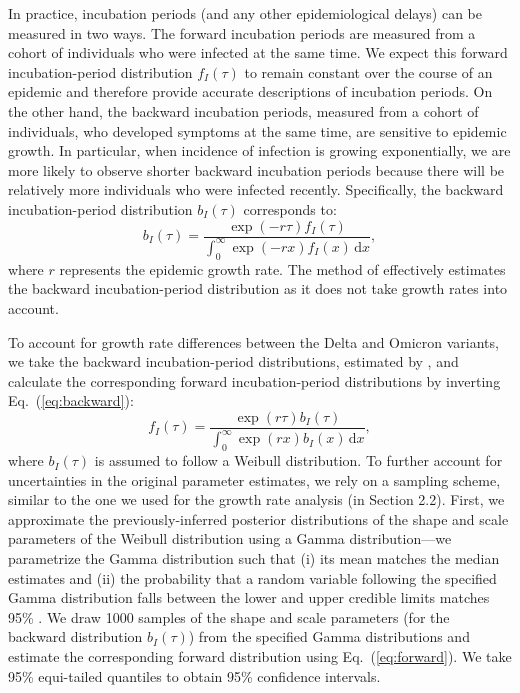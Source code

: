 \documentclass[12pt]{article}
\newcommand{\eref}[1]{Eq.~(\ref{eq:#1})}
\newcommand{\dd}[1]{\ensuremath{\, \mathrm{d}#1}}
\newcommand{\dx}{\dd{x}}
\begin{document}
In practice, incubation periods (and any other epidemiological delays) can be measured in two ways.
The forward incubation periods are measured from a cohort of individuals who were infected at the same time. 
We expect this forward incubation-period distribution $f_I(\tau)$ to remain constant over the course of an epidemic and therefore provide accurate descriptions of incubation periods.
On the other hand, the backward incubation periods, measured from a cohort of individuals, who developed symptoms at the same time, are sensitive to epidemic growth.
In particular, when incidence of infection is growing exponentially, we are more likely to observe shorter backward incubation periods because there will be relatively more individuals who were infected recently.
Specifically, the backward incubation-period distribution $b_I(\tau)$ corresponds to:
\begin{equation}
b_I(\tau) =\frac{ \exp(-r\tau) f_I(\tau)}{\int_0^\infty \exp(-r x) f_I(x)  \dx},
\label{eq:backward}
\end{equation}
where $r$ represents the epidemic growth rate.
The method of \cite{backer2020incubation} effectively estimates the backward incubation-period distribution as it does not take growth rates into account.

To account for growth rate differences between the Delta and Omicron variants, we take the backward incubation-period distributions, estimated by \cite{backer2021omicron}, and calculate the corresponding forward incubation-period distributions by inverting \eref{backward}:
\begin{equation}
f_I(\tau) = \frac{\exp(r\tau) b_I(\tau) }{\int_0^\infty \exp(rx)  b_I(x)\dx},
\label{eq:forward}
\end{equation}
where $b_I(\tau)$ is assumed to follow a Weibull distribution.
To further account for uncertainties in the original parameter estimates, we rely on a sampling scheme, similar to the one we used for the growth rate analysis (in Section 2.2).
First, we approximate the previously-inferred posterior distributions of the shape and scale parameters of the Weibull distribution using a Gamma distribution---we parametrize the Gamma distribution such that (i) its mean matches the median estimates and (ii) the probability that a random variable following the specified Gamma distribution falls between the lower and upper credible limits matches 95\% \citep{park2020reconciling}.
We draw 1000 samples of the shape and scale parameters (for the backward distribution $b_I(\tau)$) from the specified Gamma distributions and estimate the corresponding forward distribution using \eref{forward}.
We take 95\% equi-tailed quantiles to obtain 95\% confidence intervals. 
\end{document}
